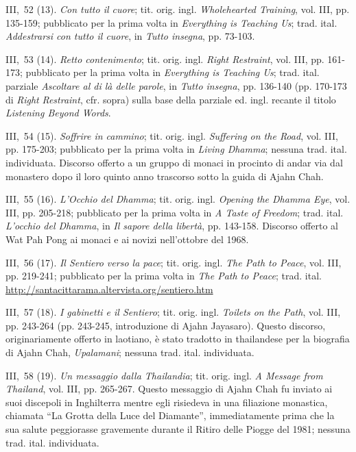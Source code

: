 III,~52 (13). \emph{Con tutto il cuore}; tit. orig. ingl.
\emph{Wholehearted Training}, vol. III, pp. 135-159; pubblicato per la
prima volta in \emph{Everything is Teaching Us}; trad. ital.
\emph{Addestrarsi con tutto il cuore}, in \emph{Tutto insegna}, pp.
73-103.

III,~53 (14). \emph{Retto contenimento}; tit. orig. ingl. \emph{Right
Restraint}, vol. III, pp. 161-173; pubblicato per la prima volta in
\emph{Everything is Teaching Us}; trad. ital. parziale \emph{Ascoltare
al di là delle parole}, in \emph{Tutto insegna}, pp. 136-140 (pp.
170-173 di \emph{Right} \emph{Restraint}, cfr. sopra) sulla base della
parziale ed. ingl. recante il titolo \emph{Listening Beyond Words}.

III,~54 (15). \emph{Soffrire in cammino}; tit. orig. ingl.
\emph{Suffering on the Road}, vol. III, pp. 175-203; pubblicato per la
prima volta in \emph{Living Dhamma}; nessuna trad. ital. individuata.
Discorso offerto a un gruppo di monaci in procinto di andar via dal
monastero dopo il loro quinto anno trascorso sotto la guida di Ajahn
Chah.

III,~55 (16). \emph{L'Occhio del Dhamma}; tit. orig. ingl. \emph{Opening
the Dhamma Eye}, vol. III, pp. 205-218; pubblicato per la prima volta in
\emph{A Taste of Freedom}; trad. ital. \emph{L'occhio del Dhamma}, in
\emph{Il sapore della libertà}, pp. 143-158. Discorso offerto al Wat Pah
Pong ai monaci e ai novizi nell'ottobre del 1968.

III,~56 (17). \emph{Il Sentiero verso la pace}; tit. orig. ingl.
\emph{The Path to Peace}, vol. III, pp. 219-241; pubblicato per la prima
volta in \emph{The Path to Peace}; trad. ital.
\url{http://santacittarama.altervista.org/sentiero.htm}

III,~57 (18). \emph{I gabinetti e il Sentiero}; tit. orig. ingl.
\emph{Toilets on the Path}, vol. III, pp. 243-264 (pp. 243-245,
introduzione di Ajahn Jayasaro). Questo discorso, originariamente
offerto in laotiano, è stato tradotto in thailandese per la biografia di
Ajahn Chah, \emph{Upalamani}; nessuna trad. ital. individuata.

III,~58 (19). \emph{Un messaggio dalla Thailandia}; tit. orig. ingl.
\emph{A Message from Thailand}, vol. III, pp. 265-267. Questo messaggio
di Ajahn Chah fu inviato ai suoi discepoli in Inghilterra mentre egli
risiedeva in una filiazione monastica, chiamata ``La Grotta della Luce
del Diamante'', immediatamente prima che la sua salute peggiorasse
gravemente durante il Ritiro delle Piogge del 1981; nessuna trad. ital.
individuata.

